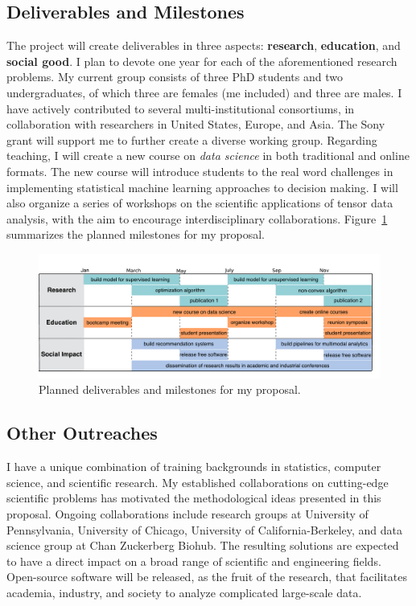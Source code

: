 \documentclass[10pt]{article}
\theoremstyle{definition}
\theoremstyle{definition}
\theoremstyle{definition}
\begin{document}
\subsection{Deliverables and Milestones}
The project will create deliverables in three aspects: {\bf research}, {\bf education}, and {\bf social good}. I plan to devote one year for each of the aforementioned research problems. My current group consists of three PhD students and two undergraduates, of which three are females (me included) and three are males. I have actively contributed to several multi-institutional consortiums, in collaboration with researchers in United States, Europe, and Asia. The Sony grant will support me to further create a diverse working group. Regarding teaching, I will create a new course on \emph{data science} in both traditional and online formats. The new course will introduce students to the real word challenges in implementing statistical machine learning approaches to decision making. I will also organize a series of workshops on the scientific applications of tensor data analysis, with the aim to encourage interdisciplinary collaborations. Figure~\ref{fig:proposal} summarizes the planned milestones for my proposal. 


\begin{figure}[!h]
\begin{center}
\includegraphics[width=.98\textwidth]{milestone.pdf}
\vspace{-.4cm}
\caption{Planned deliverables and milestones for my proposal.}\label{fig:proposal}
\end{center}
\vspace{-.4cm}
\end{figure}

\subsection{Other Outreaches}
I have a unique combination of training backgrounds in statistics, computer science, and scientific research. My established collaborations on cutting-edge scientific problems has motivated the methodological ideas presented in this proposal. Ongoing collaborations include research groups at University of Pennsylvania, University of Chicago, University of California-Berkeley, and data science group at Chan Zuckerberg Biohub. The resulting solutions are expected to have a direct impact on a broad range of scientific and engineering fields. Open-source software will be released, as the fruit of the research, that facilitates academia, industry, and society to analyze complicated large-scale data. 



\end{document}
